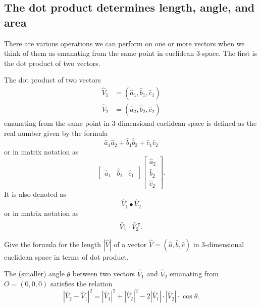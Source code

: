 \documentclass{ximera}
\begin{document}
\subsection*{The dot product determines length, angle, and area}

There are various operations we can perform on one or more vectors when we
think of them as emanating from the same point in euclidean $3$-space. The
first is the dot product of two vectors.

\begin{definition}
The dot product of two vectors%
\begin{align*}
\hat{V}_{1}  &  =\left(  \hat{a}_{1},\hat{b}_{1},\hat{c}_{1}\right) \\
\hat{V}_{2}  &  =\left(  \hat{a}_{2},\hat{b}_{2},\hat{c}_{2}\right)
\end{align*}
emanating from the same point in 3-dimensional euclidean space is
defined as the real number given by the formula%
\[
\hat{a}_{1}\hat{a}_{2}+\hat{b}_{1}\hat{b}_{2}+\hat{c}_{1}\hat{c}_{2}%
\]
or in matrix notation as%
\[
\begin{bmatrix}
\hat{a}_{1} & \hat{b}_{1} & \hat{c}_{1}%
\end{bmatrix}
\begin{bmatrix}
\hat{a}_{2}\\
\hat{b}_{2}\\
\hat{c}_{2}%
\end{bmatrix}.
\]
It is also denoted as%
\[
\hat{V}_{1}\bullet\hat{V}_{2}%
\]
or in matrix notation as%
\[
\hat{V}_{1}\cdot \hat{V}_{2}^\intercal.
\]

\end{definition}

\begin{problem}
Give the formula for the length $\left\vert \hat{V}\right\vert $ of a vector
$\hat{V}=\left(  \hat{a},\hat{b},\hat{c}\right)  $ in 3-dimensional euclidean
space in terms of dot product.
\end{problem}


\begin{lemma}
\label{110} The (smaller) angle $\theta$ between two
vectors $\hat{V}_{1}$ and $\hat{V}_{2}$ emanating from $O=\left(
0,0,0\right)  $ satisfies the relation%
\[
\left\vert \hat{V}_{2}-\hat{V}_{1}\right\vert ^{2}=\left\vert \hat{V}%
_{1}\right\vert ^{2}+\left\vert \hat{V}_{2}\right\vert ^{2}-2\left\vert
\hat{V}_{1}\right\vert \cdot\left\vert \hat{V}_{2}\right\vert \cdot
\cos\theta.
\]
\end{lemma}
\end{document}
